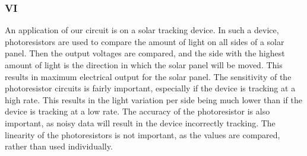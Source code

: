 \documentclass[10pt]{article}
\begin{document}
\subsubsection*{VI}
An application of our circuit is on a solar tracking device. In such a device, photoresistors are used to compare the amount of light on all sides of a solar panel. Then the output voltages are compared, and the side with the highest amount of light is the direction in which the solar panel will be moved. This results in maximum electrical output for the solar panel. The sensitivity of the photoresistor circuits is fairly important, especially if the device is tracking at a high rate. This results in the light variation per side being much lower than if the device is tracking at a low rate. The accuracy of the photoresistor is also important, as noisy data will result in the device incorrectly tracking. The linearity of the photoresistors is not important, as the values are compared, rather than used individually.
\end{document}
